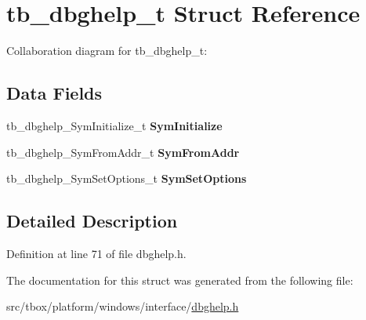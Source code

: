 \hypertarget{structtb__dbghelp__t}{\section{tb\-\_\-dbghelp\-\_\-t Struct Reference}
\label{structtb__dbghelp__t}
}


Collaboration diagram for tb\-\_\-dbghelp\-\_\-t\-:
\subsection*{Data Fields}
\begin{DoxyCompactItemize}
\item 
\hypertarget{structtb__dbghelp__t_a97d370303ec20d08c3eabee050f562ee}{tb\-\_\-dbghelp\-\_\-\-Sym\-Initialize\-\_\-t {\bfseries Sym\-Initialize}}\label{structtb__dbghelp__t_a97d370303ec20d08c3eabee050f562ee}

\item 
\hypertarget{structtb__dbghelp__t_abee5882c562cc08699c0c8c68ee33bf7}{tb\-\_\-dbghelp\-\_\-\-Sym\-From\-Addr\-\_\-t {\bfseries Sym\-From\-Addr}}\label{structtb__dbghelp__t_abee5882c562cc08699c0c8c68ee33bf7}

\item 
\hypertarget{structtb__dbghelp__t_a911da5063820cbe59cef1b716dda3b2b}{tb\-\_\-dbghelp\-\_\-\-Sym\-Set\-Options\-\_\-t {\bfseries Sym\-Set\-Options}}\label{structtb__dbghelp__t_a911da5063820cbe59cef1b716dda3b2b}

\end{DoxyCompactItemize}


\subsection{Detailed Description}


Definition at line 71 of file dbghelp.\-h.



The documentation for this struct was generated from the following file\-:\begin{DoxyCompactItemize}
\item 
src/tbox/platform/windows/interface/\hyperlink{dbghelp_8h}{dbghelp.\-h}\end{DoxyCompactItemize}
